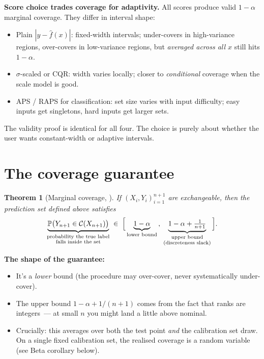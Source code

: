 \documentclass[letterpaper,11pt,leqno]{article}
\newtheorem*{thmstar}{Theorem}
\begin{document}
\begin{keyinsight}
\textbf{Score choice trades coverage for adaptivity.} All scores produce valid $1-\alpha$ marginal coverage. They differ in interval shape:
\begin{itemize}
\item Plain $|y - \hat{f}(x)|$: fixed-width intervals; under-covers in high-variance regions, over-covers in low-variance regions, but \emph{averaged across all $x$} still hits $1-\alpha$.
\item $\sigma$-scaled or CQR: width varies locally; closer to \emph{conditional} coverage when the scale model is good.
\item APS / RAPS for classification: set size varies with input difficulty; easy inputs get singletons, hard inputs get larger sets.
\end{itemize}
The validity proof is identical for all four. The choice is purely about whether the user wants constant-width or adaptive intervals.
\end{keyinsight}

\section{The coverage guarantee}\label{s:result}

\begin{thmstar}[Marginal coverage, \cite{angelopoulos2022gentle}]
If $(X_i, Y_i)_{i=1}^{n+1}$ are exchangeable, then the prediction set defined above satisfies
\begin{equation*}
\underbrace{\mathbb{P}\bigl(Y_{n+1} \in \mathcal{C}(X_{n+1})\bigr)}_{\substack{\text{probability the true label}\\\text{falls inside the set}}}
\;\in\;
\Bigl[\,
\underbrace{1 - \alpha}_{\text{lower bound}}
\,,\;
\underbrace{1 - \alpha + \tfrac{1}{n+1}}_{\substack{\text{upper bound}\\(\text{discreteness slack})}}
\,\Bigr].
\end{equation*}
\end{thmstar}

\begin{theoremexplain}
\textbf{The shape of the guarantee:}
\begin{itemize}
\item It's a \emph{lower} bound (the procedure may over-cover, never systematically under-cover).
\item The upper bound $1 - \alpha + 1/(n+1)$ comes from the fact that ranks are integers~--- at small $n$ you might land a little above nominal.
\item Crucially: this averages over both the test point \emph{and} the calibration set draw. On a single fixed calibration set, the realised coverage is a random variable (see Beta corollary below).
\end{itemize}
\end{theoremexplain}
\end{document}

